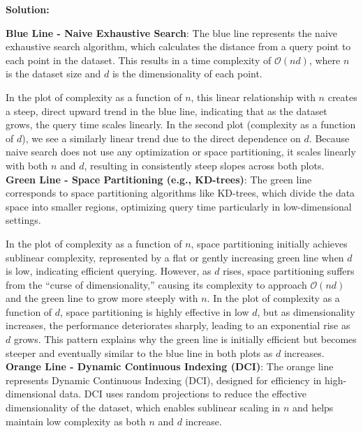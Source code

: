 \documentclass{article}
\newenvironment{solution}{\color{blue} \smallskip \textbf{Solution:}}{}
\begin{document}
\begin{enumerate}[(a)]
    \begin{solution}

\textbf{Blue Line - Naive Exhaustive Search}: The blue line represents the naive exhaustive search algorithm, which calculates the distance from a query point to each point in the dataset. This results in a time complexity of \(\mathcal{O}(nd)\), where \(n\) is the dataset size and \(d\) is the dimensionality of each point. 

In the plot of complexity as a function of \(n\), this linear relationship with \(n\) creates a steep, direct upward trend in the blue line, indicating that as the dataset grows, the query time scales linearly. In the second plot (complexity as a function of \(d\)), we see a similarly linear trend due to the direct dependence on \(d\). Because naive search does not use any optimization or space partitioning, it scales linearly with both \(n\) and \(d\), resulting in consistently steep slopes across both plots.\\

\textbf{Green Line - Space Partitioning (e.g., KD-trees)}: The green line corresponds to space partitioning algorithms like KD-trees, which divide the data space into smaller regions, optimizing query time particularly in low-dimensional settings. 

In the plot of complexity as a function of \(n\), space partitioning initially achieves sublinear complexity, represented by a flat or gently increasing green line when \(d\) is low, indicating efficient querying. However, as \(d\) rises, space partitioning suffers from the “curse of dimensionality,” causing its complexity to approach \(\mathcal{O}(nd)\) and the green line to grow more steeply with \(n\). In the plot of complexity as a function of \(d\), space partitioning is highly effective in low \(d\), but as dimensionality increases, the performance deteriorates sharply, leading to an exponential rise as \(d\) grows. This pattern explains why the green line is initially efficient but becomes steeper and eventually similar to the blue line in both plots as \(d\) increases.\\

\textbf{Orange Line - Dynamic Continuous Indexing (DCI)}: The orange line represents Dynamic Continuous Indexing (DCI), designed for efficiency in high-dimensional data. DCI uses random projections to reduce the effective dimensionality of the dataset, which enables sublinear scaling in \(n\) and helps maintain low complexity as both \(n\) and \(d\) increase. 


\end{solution}
\end{enumerate}
\end{document}
